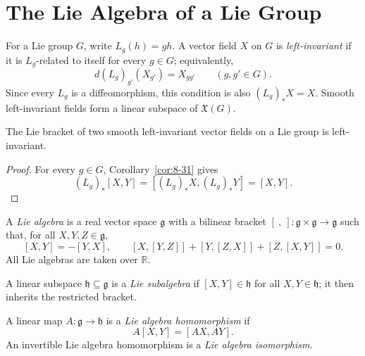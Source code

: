 \section{The Lie Algebra of a Lie Group}

\begin{definition}
\label{def:8-60-extra-1}
\leanok
For a Lie group $G$, write $L_g(h)=gh$. A vector field $X$ on $G$ is
\emph{left-invariant} if it is $L_g$-related to itself for every $g\in G$;
equivalently,
\[
d(L_g)_{g'}(X_{g'})=X_{gg'}
\qquad(g,g'\in G). \tag{8.12}
\]
Since every $L_g$ is a diffeomorphism, this condition is also
$(L_g)_*X=X$. Smooth left-invariant fields form a linear subspace of
$\mathfrak{X}(G)$.
\end{definition}

\begin{proposition}
\label{prop:8-33}
\leanok
{}
The Lie bracket of two smooth left-invariant vector fields on a Lie group is
left-invariant.
\end{proposition}

\begin{proof}
\leanok
\sketch For every $g\in G$, Corollary~\ref{cor:8-31} gives
\[
(L_g)_*[X,Y]=[(L_g)_*X,(L_g)_*Y]=[X,Y].
\]
\end{proof}

\begin{definition}
\label{def:8-60-extra-2}
\mathlibok
A \emph{Lie algebra} is a real vector space $\mathfrak g$ with a bilinear
bracket $[\ ,\ ]\colon\mathfrak g\times\mathfrak g\to\mathfrak g$ such that,
for all $X,Y,Z\in\mathfrak g$,
\[
[X,Y]=-[Y,X],
\qquad
[X,[Y,Z]]+[Y,[Z,X]]+[Z,[X,Y]]=0.
\]
All Lie algebras are taken over $\mathbb{R}$.
\end{definition}

\begin{definition}
\label{def:8-60-extra-3}
\mathlibok
A linear subspace $\mathfrak h\subseteq\mathfrak g$ is a \emph{Lie
subalgebra} if $[X,Y]\in\mathfrak h$ for all $X,Y\in\mathfrak h$; it then
inherits the restricted bracket.
\end{definition}

\begin{definition}
\label{def:8-60-extra-4}
\mathlibok
A linear map $A\colon\mathfrak g\to\mathfrak h$ is a \emph{Lie algebra
homomorphism} if
\[
A[X,Y]=[AX,AY].
\]
An invertible Lie algebra homomorphism is a \emph{Lie algebra isomorphism}.
\end{definition}

